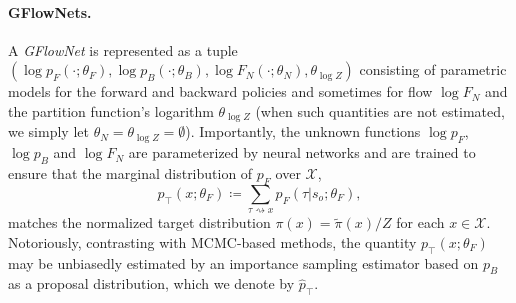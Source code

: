 \documentclass{article}
\theoremstyle{plain}
\theoremstyle{definition}
\theoremstyle{remark}
\theoremstyle{remark}
\begin{document}
\paragraph{GFlowNets.} A \textit{GFlowNet} is represented as a tuple $(\log p_{F}(\cdot ; \theta_{F}), \log p_{B}(\cdot ; \theta_{B}), \log F_{N}(\cdot ; \theta_{N}), \theta_{\log Z})$ consisting of parametric models for the forward and backward policies and sometimes for flow $\log F_{N}$ and the partition function's logarithm $\theta_{\log Z}$ (when such quantities are not estimated, we simply let $\theta_{N} = \theta_{\log Z} = \emptyset$). Importantly, the unknown functions $\log p_{F}$, $\log p_{B}$ and $\log F_{N}$ are parameterized by neural networks and are trained to ensure that the marginal distribution of $p_{F}$ over $\mathcal{X}$, 
\begin{equation} \label{eq:marg} 
    p_{\intercal}(x ; \theta_{F}) \coloneqq \sum_{\tau \rightsquigarrow x} p_{F}(\tau | s_{o} ; \theta_{F}),  
\end{equation}
matches the normalized target distribution $\pi(x) = \tilde{\pi}(x) / Z$ for each $x \in \mathcal{X}$. Notoriously, contrasting with MCMC-based methods, the quantity $p_{\intercal}(x ; \theta_{F})$ may be unbiasedly estimated by an importance sampling estimator based on $p_{B}$ as a proposal distribution, which we denote by $\hat{p}_{\intercal}$. 

\end{document}

